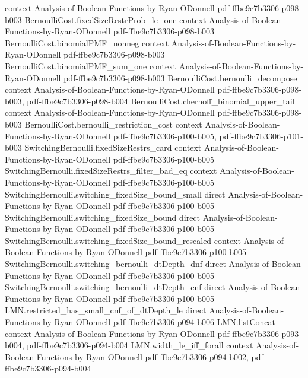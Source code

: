 \begin{lemma}
  {context}
  {Analysis-of-Boolean-Functions-by-Ryan-ODonnell}
  {pdf-ffbe9c7b3306-p098-b003}
\proofstep
  {BernoulliCost.fixedSizeRestrProb_le_one}
  {context}
  {Analysis-of-Boolean-Functions-by-Ryan-ODonnell}
  {pdf-ffbe9c7b3306-p098-b003}
\proofstep
  {BernoulliCost.binomialPMF_nonneg}
  {context}
  {Analysis-of-Boolean-Functions-by-Ryan-ODonnell}
  {pdf-ffbe9c7b3306-p098-b003}
\proofstep
  {BernoulliCost.binomialPMF_sum_one}
  {context}
  {Analysis-of-Boolean-Functions-by-Ryan-ODonnell}
  {pdf-ffbe9c7b3306-p098-b003}
\proofstep
  {BernoulliCost.bernoulli_decompose}
  {context}
  {Analysis-of-Boolean-Functions-by-Ryan-ODonnell}
  {pdf-ffbe9c7b3306-p098-b003,
    pdf-ffbe9c7b3306-p098-b004}
\proofstep
  {BernoulliCost.chernoff_binomial_upper_tail}
  {context}
  {Analysis-of-Boolean-Functions-by-Ryan-ODonnell}
  {pdf-ffbe9c7b3306-p098-b003}
\proofstep
  {BernoulliCost.bernoulli_restriction_cost}
  {context}
  {Analysis-of-Boolean-Functions-by-Ryan-ODonnell}
  {pdf-ffbe9c7b3306-p100-b005,
    pdf-ffbe9c7b3306-p101-b003}
\proofstep
  {SwitchingBernoulli.fixedSizeRestrs_card}
  {context}
  {Analysis-of-Boolean-Functions-by-Ryan-ODonnell}
  {pdf-ffbe9c7b3306-p100-b005}
\proofstep
  {SwitchingBernoulli.fixedSizeRestrs_filter_bad_eq}
  {context}
  {Analysis-of-Boolean-Functions-by-Ryan-ODonnell}
  {pdf-ffbe9c7b3306-p100-b005}
\proofstep
  {SwitchingBernoulli.switching_fixedSize_bound_small}
  {direct}
  {Analysis-of-Boolean-Functions-by-Ryan-ODonnell}
  {pdf-ffbe9c7b3306-p100-b005}
\proofstep
  {SwitchingBernoulli.switching_fixedSize_bound}
  {direct}
  {Analysis-of-Boolean-Functions-by-Ryan-ODonnell}
  {pdf-ffbe9c7b3306-p100-b005}
\proofstep
  {SwitchingBernoulli.switching_fixedSize_bound_rescaled}
  {context}
  {Analysis-of-Boolean-Functions-by-Ryan-ODonnell}
  {pdf-ffbe9c7b3306-p100-b005}
\proofstep
  {SwitchingBernoulli.switching_bernoulli_dtDepth_dnf}
  {direct}
  {Analysis-of-Boolean-Functions-by-Ryan-ODonnell}
  {pdf-ffbe9c7b3306-p100-b005}
\proofstep
  {SwitchingBernoulli.switching_bernoulli_dtDepth_cnf}
  {direct}
  {Analysis-of-Boolean-Functions-by-Ryan-ODonnell}
  {pdf-ffbe9c7b3306-p100-b005}
\proofstep
  {LMN.restricted_has_small_cnf_of_dtDepth_le}
  {direct}
  {Analysis-of-Boolean-Functions-by-Ryan-ODonnell}
  {pdf-ffbe9c7b3306-p094-b006}
\proofstep
  {LMN.listConcat}
  {context}
  {Analysis-of-Boolean-Functions-by-Ryan-ODonnell}
  {pdf-ffbe9c7b3306-p093-b004,
    pdf-ffbe9c7b3306-p094-b004}
\proofstep
  {LMN.width_le_iff_forall}
  {context}
  {Analysis-of-Boolean-Functions-by-Ryan-ODonnell}
  {pdf-ffbe9c7b3306-p094-b002,
    pdf-ffbe9c7b3306-p094-b004}

\end{lemma}
